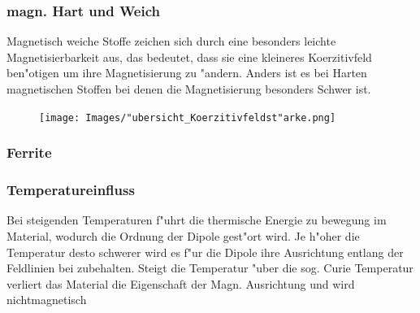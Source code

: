         \subsubsection*{magn. Hart und Weich}
            Magnetisch weiche Stoffe zeichen sich durch eine besonders leichte Magnetisierbarkeit aus, das bedeutet,
            dass sie eine kleineres Koerzitivfeld ben"otigen um ihre Magnetisierung zu "andern. Anders ist es bei Harten
            magnetischen Stoffen bei denen die Magnetisierung besonders Schwer ist.
            \begin{figure}[H]
                \centering
                \texttt{[image: Images/"ubersicht\_Koerzitivfeldst"arke.png]}
            \end{figure}
        \subsubsection*{Ferrite}

        \subsubsection*{Temperatureinfluss}
            Bei steigenden Temperaturen f"uhrt die thermische Energie zu bewegung im Material, wodurch die Ordnung der
            Dipole gest"ort wird. Je h"oher die Temperatur desto schwerer wird es f"ur die Dipole ihre Ausrichtung entlang
            der Feldlinien bei zubehalten. Steigt die Temperatur "uber die sog. Curie Temperatur verliert das Material
            die Eigenschaft der Magn. Ausrichtung und wird nichtmagnetisch
